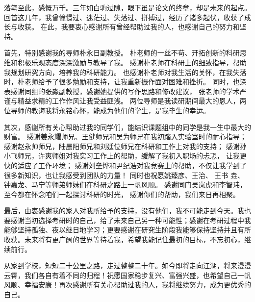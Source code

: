 
\begin{thanks}


落笔至此，感慨万千。三年如白驹过隙，眼下虽是论文的终章，却是未来的起点。
回首这几年，我曾憧憬过、迷茫过、失落过、拼搏过，经历了诸多起伏，收获了成长与收获。
在此，我要衷心感谢所有曾经帮助过我的人，也感谢自己的努力和坚持。


首先，特别感谢我的导师朴永日副教授。
朴老师的一丝不苟、开拓创新的科研思维和积极乐观态度深深激励与教导了我。
感谢朴老师在科研上的细致指导，帮助我规划研究方向，培养我的科研能力。
也感谢朴老师对我生活的关怀，在我失落时，朴老师给予了很多勉励和支持，让我重新振作面对困难和挫折。
同时，也深表感谢同组的张淼副教授，感谢她提供的写作思路和修改建议，
张老师的学术严谨与精益求精的工作作风让我受益匪浅。
两位导师是我读研期间最大的恩人，两位导师的教诲我将永铭心怀，能成为他们的学生，是我毕生的幸运。


其次，感谢所有关心帮助过我的同学们，能结识课题组中的同学是我一生中最大的财富。
感谢姜永耀师兄、王健师兄和吴为师兄在我初踏入实验室时的耐心指导；
感谢赵永帅师兄，陆晨阳师兄和刘廷位师兄在科研和工作上对我的支持；
感谢孙小飞师兄，许爽师姐对我实习工作上的帮助，缓解了我初入职场的忐忑，
让我更快的适应了工作环境；
感谢刘垒烨和尹纪浩对我竞赛上的帮助，不仅让我学到了很多新知识，也让我感受到团队的力量！
同时也祝愿姚臻彦、王治、
王书{ 垚}、
钟嘉龙、马宁等师弟师妹们在科研之路上一帆风顺。
感谢同门吴岚虎和李智玮，至今都在怀念咱们一起探讨科研的时光，
感谢你们的帮助，我们来日再相聚。


最后，由衷感谢我的家人对我所给予的支持，没有他们，我不可能走到今天。我也要感谢当初选择考研时的自己，给了未来自己另一种可能性；感谢在考研过程中我能够坚持孤独、夜以继日地学习；更要感谢在研究生阶段我能够保持坚持并且有所收获。未来将有更广阔的世界等待着我，希望我能记住最初的目标，不忘初心，继续前行。


从家到学校，短短二十公里之路，走过整整二十年。如今即将走向江湖，将来漫漫云霄，我们各自有着不同的归程！祝愿国家稳步复兴、富强兴盛，也希望自己一帆风顺、幸福安康！再次感谢所有关心帮助过我的人，我将继续努力，成为更优秀的自己。


%

\end{thanks}

